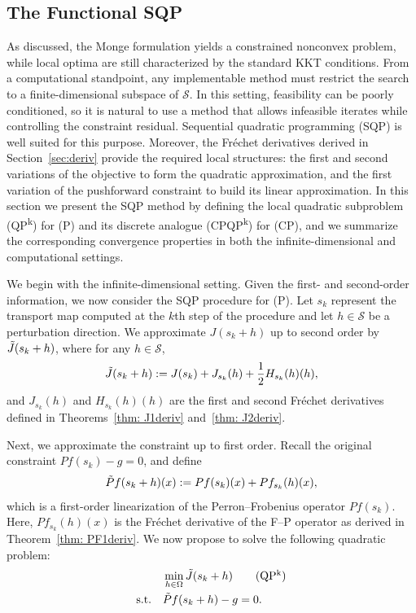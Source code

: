 \documentclass[12pt,leqno]{amsart}
\begin{document}
\subsection{The Functional SQP}\label{subsec:SQP}
As discussed, the Monge formulation yields a constrained nonconvex problem, while local optima are still characterized by the standard KKT conditions. From a computational standpoint, any implementable method must restrict the search to a finite-dimensional subspace of $\mathcal{S}$. In this setting, feasibility can be poorly conditioned, so it is natural to use a method that allows infeasible iterates while controlling the constraint residual. Sequential quadratic programming (SQP) is well suited for this purpose. Moreover, the Fr\'echet derivatives derived in Section~\ref{sec:deriv} provide the required local structures: the first and second variations of the objective to form the quadratic approximation, and the first variation of the pushforward constraint to build its linear approximation.
In this section we present the SQP method by defining the local quadratic subproblem (QP\textsuperscript{k}) for (P) and its discrete analogue (CPQP\textsuperscript{k}) for (CP), and we summarize the corresponding convergence properties in both the infinite-dimensional and computational settings.

We begin with the infinite-dimensional setting. Given the first- and second-order information, we now consider the SQP procedure for (P). Let $s_k$ represent the transport map computed at the $k$th step of the procedure and let $h\in\mathcal{S}$ be a perturbation direction. We approximate $J(s_k+h)$ up to second order by $\Tilde{J}(s_k+h)$, where for any $h\in\mathcal{S}$,
\begin{align*}
    \Tilde{J}(s_k+ h) := J(s_k) + J_{s_k}(h)+ \frac{1}{2}H_{s_k}(h)(h),
\end{align*}
and $J_{s_k}(h)$ and $H_{s_k}(h)(h)$ are the first and second Fr\'echet derivatives defined in Theorems~\ref{thm: J1deriv} and~\ref{thm: J2deriv}.

Next, we approximate the constraint up to first order. Recall the original constraint $Pf(s_k)-g = 0$, and define
\begin{align*}
    \Tilde{P}f(s_k+h)(x) := Pf(s_k)(x) + Pf_{s_k}(h)(x),
\end{align*}
which is a first-order linearization of the Perron--Frobenius operator $Pf(s_k)$. Here, $Pf_{s_k}(h)(x)$ is the Fr\'echet derivative of the F--P operator as derived in Theorem~\ref{thm: PF1deriv}. We now propose to solve the following quadratic problem:
\begin{align*}
      &\min_{h\in\Omega}\Tilde{J}(s_k + h)\tag{QP\textsuperscript{k}}\\
    \text{s.t.}\quad &\Tilde{P}f(s_k+h)-g = 0.  
\end{align*}
\end{document}

